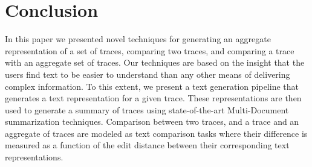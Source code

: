 \section{Conclusion}
\label{sec:conclusion}

In this paper we presented novel techniques for generating an aggregate representation
of a set of traces, comparing two traces, and comparing a trace with an aggregate
set of traces. Our techniques are based on the insight that the users find
text to be easier to understand than any other means of delivering complex information.
To this extent, we present a text generation pipeline that generates a text representation
for a given trace. These representations are then used to generate a summary of traces
using state-of-the-art Multi-Document summarization techniques. Comparison
between two traces, and a trace and an aggregate of traces are modeled as text comparison tasks
where their difference is measured as a function of the edit distance between their corresponding
text representations.